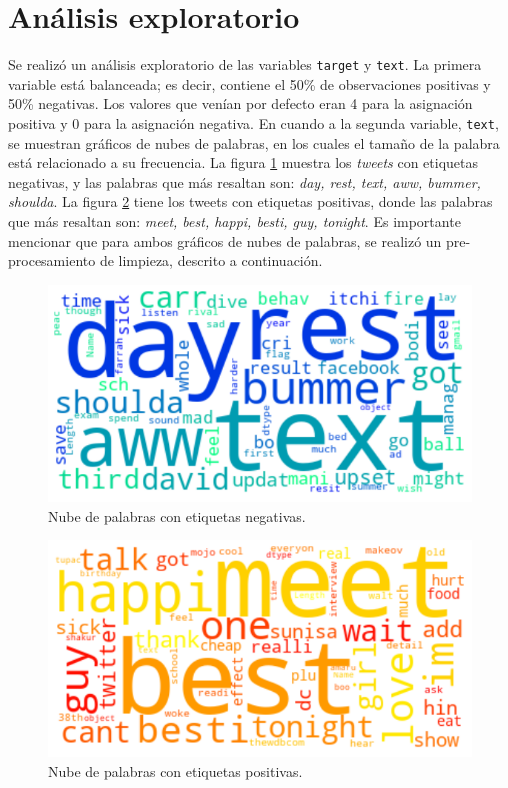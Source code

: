 \documentclass[sigconf, nonacm, spanish]{acmart}
\begin{document}
\section{Análisis exploratorio}

Se realizó un análisis exploratorio de las variables \texttt{target} y \texttt{text}. La primera variable está balanceada; es decir, contiene el 50\% de observaciones positivas y 50\% negativas. Los valores que venían por defecto eran 4 para la asignación positiva y 0 para la asignación negativa. En cuando a la segunda variable, \texttt{text}, se muestran gráficos de nubes de palabras, en los cuales el tamaño de la palabra está relacionado a su frecuencia. La figura \ref{fig:neg} muestra los \textit{tweets} con etiquetas negativas, y las palabras que más resaltan son: \textit{day, rest, text, aww, bummer, shoulda}. La figura \ref{fig:pos} tiene los tweets con etiquetas positivas, donde las palabras que más resaltan son: \textit{meet, best, happi, besti, guy, tonight}. Es importante mencionar que para ambos gráficos de nubes de palabras, se realizó un pre-procesamiento de limpieza, descrito a continuación. 


\begin{figure}
  \centering
  \includegraphics[width=\linewidth]{figures/wordcloud_negativo}
  \caption{Nube de palabras con etiquetas negativas.}
  \label{fig:neg}
\end{figure}

\begin{figure}
  \centering
  \includegraphics[width=\linewidth]{figures/wordcloud_positivo}
  \caption{Nube de palabras con etiquetas positivas.}
  \label{fig:pos}
\end{figure}
\end{document}
